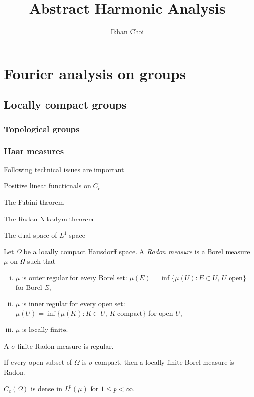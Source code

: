 \documentclass{../../large}
\begin{document}
\title{Abstract Harmonic Analysis}
\author{Ikhan Choi}
\maketitle
\tableofcontents



\part{Fourier analysis on groups}
\chapter{Locally compact groups}
\section{Topological groups}
\section{Haar measures}




\begin{prb}
Following technical issues are important
\begin{parts}
\item Positive linear functionals on $C_c$
\item The Fubini theorem
\item The Radon-Nikodym theorem
\item The dual space of $L^1$ space
\end{parts}
\end{prb}



\begin{prb}
Let $\Omega$ be a locally compact Hausdorff space.
A \emph{Radon measure} is a Borel measure $\mu$ on $\Omega$ such that
\begin{enumerate}[(i)]
\item $\mu$ is outer regular for every Borel set: $\mu(E)=\inf\{\mu(U):E\subset U,\,U\text{ open}\}$ for Borel $E$,
\item $\mu$ is inner regular for every open set: $\mu(U)=\inf\{\mu(K):K\subset U,\,K\text{ compact}\}$ for open $U$,
\item $\mu$ is locally finite.
\end{enumerate}
\begin{parts}
\item A $\sigma$-finite Radon measure is regular.
\item If every open subset of $\Omega$ is $\sigma$-compact, then a locally finite Borel measure is Radon.
\item $C_c(\Omega)$ is dense in $L^p(\mu)$ for $1\le p<\infty$.
\end{parts}
\end{prb}
\end{document}
